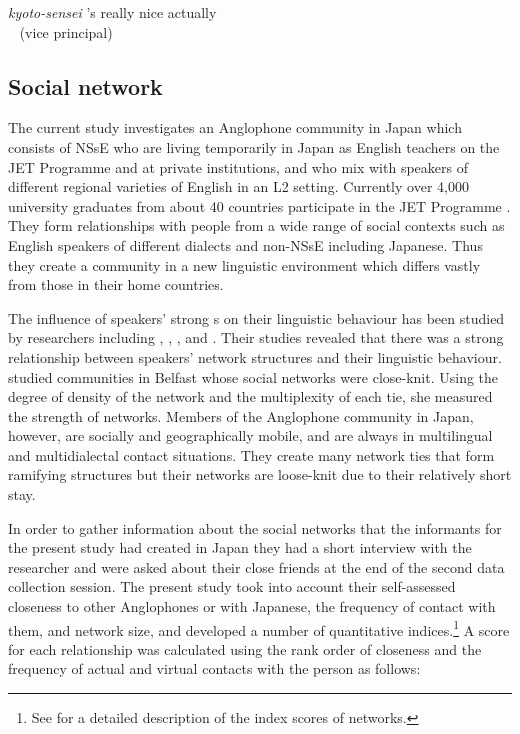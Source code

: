 \documentclass[output=paper]{LSP/langsci}
\begin{document}
\ea
{} {\textit{kyoto-sensei}} {'s really nice actually}\\
{~} {(vice principal)} {~}\\
\z

\subsection{Social network}
The current study investigates an Anglophone community in Japan which consists of NSsE who are living temporarily in Japan as English teachers on the JET Programme and at private institutions, and who mix with speakers of different regional varieties of English in an L2 setting. Currently over 4,000 university graduates from about 40 countries participate in the JET Programme \citep{council_of_local_authorities_for_international_relations_[clair]_jet_2013}. They form relationships with people from a wide range of social contexts such as English speakers of different dialects and non-NSsE including Japanese. Thus they create a community in a new linguistic environment which differs vastly from those in their home countries.

The influence of speakers’ strong s on their linguistic behaviour has been studied by researchers including \citet{cheshire_variation_1982}, \citet{eckert_adolescent_1988}, \citet{hirano_dialect_2013}, \citet{labov_language_1972} and \citet{milroy_language_1987}. Their studies revealed that there was a strong relationship between speakers’ network structures and their linguistic behaviour. \citet{milroy_language_1987} studied communities in Belfast whose social networks were close-knit. Using the degree of density of the network and the multiplexity of each tie, she measured the strength of networks. Members of the Anglophone community in Japan, however, are socially and geographically mobile, and are always in multilingual and multidialectal contact situations. They create many network ties that form ramifying structures but their networks are loose-knit due to their relatively short stay.

In order to gather information about the social networks that the informants for the present study had created in Japan they had a short interview with the researcher and were asked about their close friends at the end of the second data collection session. The present study took into account their self-assessed closeness to other Anglophones or with Japanese, the frequency of contact with them, and network size, and developed a number of quantitative indices.\footnote{See \citet{hirano_dialect_2013} for a detailed description of the index scores of networks.} A score for each relationship was calculated using the rank order of closeness and the frequency of actual and virtual contacts with the person as follows:
\end{document}

